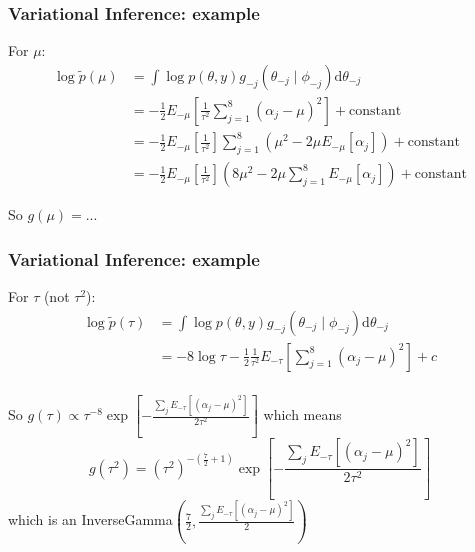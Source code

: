 \documentclass{beamer}
\begin{document}
\begin{frame}[fragile]
\frametitle{Variational Inference: example}


For $\mu$:
\begin{align*}
\log\tilde{p}(\mu) &= \int\log p(\theta, y)g_{-j}(\theta_{-j} \mid \phi_{-j}) \text{d}\theta_{-j} \\
&= - \frac{1}{2}E_{-\mu}\left[ \frac{1}{\tau^2}\sum_{j=1}^8(\alpha_j - \mu)^2\right] + \text{constant} \\
&= - \frac{1}{2}E_{-\mu}\left[ \frac{1}{\tau^2} \right] \sum_{j=1}^8 \left( \mu^2 - 2 \mu E_{-\mu}[ \alpha_j] \right) + \text{constant} \\
&= - \frac{1}{2}E_{-\mu}\left[ \frac{1}{\tau^2} \right]  \left( 8 \mu^2 - 2 \mu \sum_{j=1}^8 E_{-\mu}[ \alpha_j] \right) + \text{constant}
\end{align*}

So $g(\mu) = $...
\end{frame}

\begin{frame}[fragile]
\frametitle{Variational Inference: example}


For $\tau$ (not $\tau^2$):
\begin{align*}
\log\tilde{p}(\tau) &= \int\log p(\theta, y)g_{-j}(\theta_{-j} \mid \phi_{-j}) \text{d}\theta_{-j} \\
&= - 8 \log \tau - \frac{1}{2}\frac{1}{\tau^2} E_{-\tau}\left[ \sum_{j=1}^8(\alpha_j - \mu)^2 \right] + c \\
\end{align*}

So $g(\tau) \propto \tau^{-8} \exp\left[-\frac{\sum_jE_{-\tau}[(\alpha_j - \mu)^2]}{2 \tau^2} \right]$ which means $$
g(\tau^2) = (\tau^2)^{-(\frac{7}{2}+1)}\exp\left[-\frac{\sum_jE_{-\tau}[(\alpha_j - \mu)^2]}{2 \tau^2} \right]
$$
which is an InverseGamma$\left( \frac{7}{2}, \frac{\sum_jE_{-\tau}[(\alpha_j - \mu)^2]}{2 }\right)$
\end{frame}
\end{document}
